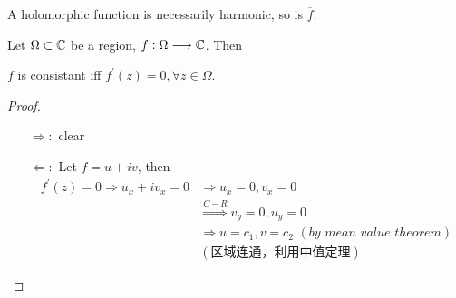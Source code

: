 \vspace{2em}
A holomorphic function is necessarily harmonic, so is $\overline{f}$.
\begin{proposition}\label{prop 2.5.3}
	Let $\Omega \subset \mathbb{C}$ be a region, $f : \Omega \longrightarrow \mathbb{C}$. Then
	\begin{center}
		$f$ is consistant iff $f^{'}(z) = 0 , \forall z \in \Omega$.
	\end{center}
	
	\vspace{2em}
	\begin{proof}
		\begin{enumerate}
			\item[$\Rightarrow:$]clear
			
			\item[$\Leftarrow:$]Let $f = u + i v$, then
			\begin{align}
				f^{'}(z) = 0 \Rightarrow u_x + i v_x = 0 &\Rightarrow u_x = 0 , v_x = 0 \\
				&\overset{C-R}{\Rightarrow} v_y = 0 , u_y = 0 \\
				&\Rightarrow u = c_1 , v = c_2 \,\, (by \,\, mean \,\, value \,\, theorem) \\
				&(\text{区域连通，利用中值定理})
			\end{align}
		\end{enumerate}
	\end{proof}
\end{proposition}

\newpage
